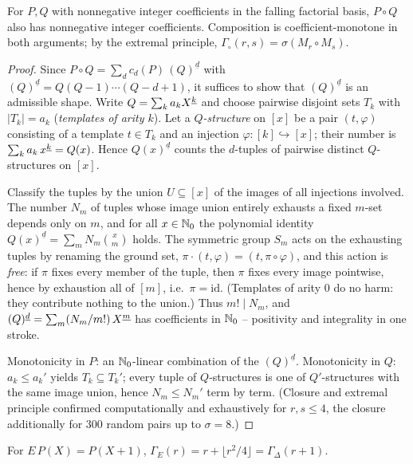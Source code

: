 \begin{satz}
For $P,Q$ with nonnegative integer coefficients in the falling
factorial basis, $P\circ Q$ also has nonnegative integer
coefficients. Composition is coefficient-monotone in both
arguments; by the extremal principle,
$\Gamma_\circ(r,s)=\sigma(M_r\circ M_s)$.
\end{satz}

\begin{proof}
Since $P\circ Q=\sum_d c_d(P)\,(Q)^{\underline d}$ with
$(Q)^{\underline d}=Q(Q{-}1)\cdots(Q{-}d{+}1)$, it suffices to
show that $(Q)^{\underline d}$ is an admissible shape. Write
$Q=\sum_k a_kX^{\underline{k}}$ and choose pairwise disjoint sets $T_k$ with
$|T_k|=a_k$ (\emph{templates of arity $k$}). Let a
\emph{$Q$-structure} on $[x]$ be a pair $(t,\varphi)$ consisting
of a template $t\in T_k$ and an injection
$\varphi\colon[k]\hookrightarrow[x]$; their number is
$\sum_k a_k\,x^{\underline{k}}=Q(x)$. Hence $Q(x)^{\underline d}$ counts the
$d$-tuples of pairwise distinct $Q$-structures on $[x]$.

Classify the tuples by the union $U\subseteq[x]$ of the images of
all injections involved. The number $N_m$ of tuples whose image
union entirely exhausts a fixed $m$-set depends only on $m$, and
for all $x\in\mathbb N_0$ the polynomial identity
$Q(x)^{\underline d}=\sum_m N_m\binom xm$ holds. The symmetric
group $S_m$ acts on the exhausting tuples by renaming the ground
set, $\pi\cdot(t,\varphi)=(t,\pi\circ\varphi)$, and this action is
\emph{free}: if $\pi$ fixes every member of the tuple, then $\pi$
fixes every image pointwise, hence by exhaustion all of $[m]$,
i.e.\ $\pi=\mathrm{id}$. (Templates of arity 0 do no harm: they
contribute nothing to the union.) Thus $m!\mid N_m$, and
$(Q)^{\underline d}=\sum_m(N_m/m!)\,X^{\underline{m}}$ has coefficients in
$\mathbb N_0$ -- positivity and integrality in one stroke.

Monotonicity in $P$: an $\mathbb N_0$-linear combination of the
$(Q)^{\underline d}$. Monotonicity in $Q$: $a_k\le a_k'$ yields
$T_k\subseteq T_k'$; every tuple of $Q$-structures is one of
$Q'$-structures with the same image union, hence $N_m\le N_m'$
term by term. (Closure and extremal principle confirmed
computationally and exhaustively for $r,s\le4$, the closure
additionally for 300 random pairs up to $\sigma=8$.)
\end{proof}

\begin{satz}
For $E\,P(X)=P(X{+}1)$,
$\Gamma_E(r)=r+\lfloor r^2/4\rfloor=\Gamma_\Delta(r{+}1)$.
\end{satz}

